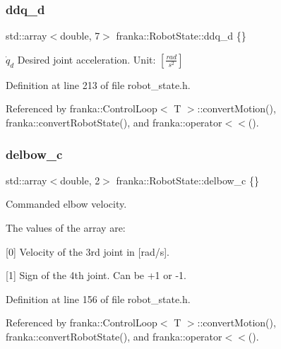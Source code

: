\mbox{\label{structfranka_1_1RobotState_a6251e748cf72f4b86bcfdcb97d77ace2}} 
\subsubsection{\texorpdfstring{ddq\+\_\+d}{ddq\_d}}
{\footnotesize\ttfamily std\+::array$<$double, 7$>$ franka\+::\+Robot\+State\+::ddq\+\_\+d \{\}}

$\dot{q}_d$ Desired joint acceleration. Unit\+: $[\frac{rad}{s^2}]$ 

Definition at line 213 of file robot\+\_\+state.\+h.



Referenced by franka\+::\+Control\+Loop$<$ T $>$\+::convert\+Motion(), franka\+::convert\+Robot\+State(), and franka\+::operator$<$$<$().

\mbox{\label{structfranka_1_1RobotState_a57c2c145e9f79010adf23085b8a9c5ad}} 
\subsubsection{\texorpdfstring{delbow\+\_\+c}{delbow\_c}}
{\footnotesize\ttfamily std\+::array$<$double, 2$>$ franka\+::\+Robot\+State\+::delbow\+\_\+c \{\}}

Commanded elbow velocity.

The values of the array are\+:
\begin{DoxyItemize}
\item \mbox{[}0\mbox{]} Velocity of the 3rd joint in \mbox{[}rad/s\mbox{]}.
\item \mbox{[}1\mbox{]} Sign of the 4th joint. Can be +1 or -\/1. 
\end{DoxyItemize}

Definition at line 156 of file robot\+\_\+state.\+h.



Referenced by franka\+::\+Control\+Loop$<$ T $>$\+::convert\+Motion(), franka\+::convert\+Robot\+State(), and franka\+::operator$<$$<$().

\mbox{\label{structfranka_1_1RobotState_af372a0081d72bc7b4fe873f99c7b2d8c}} 
